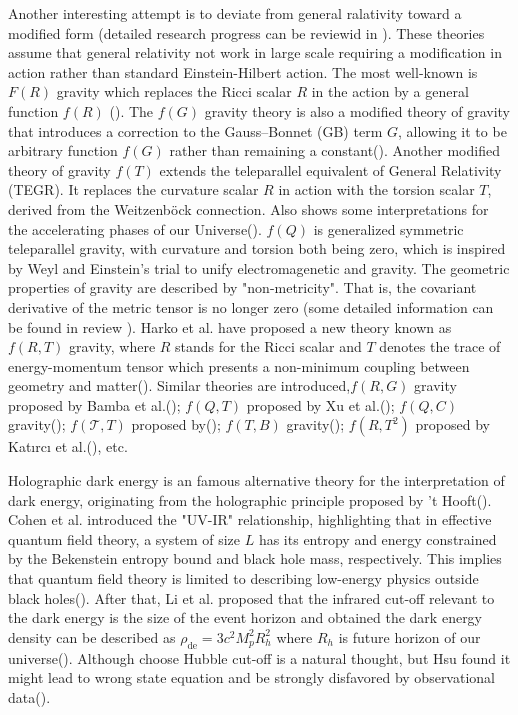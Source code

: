 \documentclass[preprint]{aastex631}
\begin{document}
Another interesting attempt is to deviate from general ralativity toward a modified form (detailed research progress can be reviewid in \cite{Clifton_2012}). These theories assume that general relativity not work in large scale requiring a modification in action rather than standard Einstein-Hilbert action. The most well-known is $F(R)$ gravity which replaces the Ricci scalar $R$ in the action by a general function $f(R)$ (\cite{1970MNRAS.150....1B}). The $f(G)$ gravity theory is also a modified theory of gravity that introduces a correction to the Gauss–Bonnet (GB) term $G$, allowing it to be arbitrary function $f(G)$ rather than remaining a constant(\cite{NOJIRI20051,NOJIRI_2007}). Another modified theory of gravity $f(T)$ extends the teleparallel equivalent of General Relativity (TEGR). It replaces the curvature scalar $R$ in action with the torsion scalar $T$, derived from the Weitzenböck connection. Also shows some interpretations for the accelerating phases of our Universe(\cite{Cai_2016,Bengochea_2009}). $f(Q)$ is generalized symmetric teleparallel gravity, with curvature and torsion both being zero, which is inspired by Weyl and Einstein's trial to unify electromagenetic and gravity. The geometric properties of gravity are described by "non-metricity". That is, the covariant derivative of the metric tensor is no longer zero (some detailed information can be found in review \cite{HEISENBERG20241}). Harko et al. have proposed a new theory known as $f (R, T )$ gravity, where $R$ stands for the Ricci scalar and $T$ denotes the trace of energy-momentum tensor which presents a non-minimum coupling between geometry and matter(\cite{PhysRevD.84.024020}). Similar theories are introduced,$f(R,G)$ gravity proposed by Bamba et al.(\cite{Bamba2009FinitetimeFS}); $f(Q,T)$ proposed by Xu et al.(\cite{Xu_2019}); $f(Q,C)$ gravity(\cite{De_2024}); $f(\mathcal{T},T)$ proposed by(\cite{Harko_2014}); $f(T,B)$ gravity(\cite{Bahamonde_2015,Bahamonde_2017}); $f(R,T^2)$ proposed by Katırcı et al.(\cite{Kat_rc__2014}), etc.

Holographic dark energy is an famous alternative theory for the interpretation of dark energy, originating from the holographic principle proposed by ’t Hooft(\cite{hooft2009dimensionalreductionquantumgravity}). Cohen et al. introduced the "UV-IR" relationship, highlighting that in effective quantum field theory, a system of size $L$ has its entropy and energy constrained by the Bekenstein entropy bound and black hole mass, respectively. This implies that quantum field theory is limited to describing low-energy physics outside black holes(\cite{cohen_effective_1999}). After that, Li et al. proposed that the infrared cut-off relevant to the dark energy is the size of the event horizon and obtained the dark energy density can be described as $\rho_\text{de}=3c^2 M_p^2 R_h^2$ where $R_h$ is future horizon of our universe(\cite{LI20041}). Although choose Hubble cut-off is a natural thought, but Hsu found it might lead to wrong state equation and be strongly disfavored by observational data(\cite{Hsu_2004}).
\end{document}
